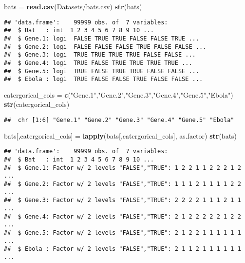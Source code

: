 \documentclass[
]{article}
\author{}
\date{\vspace{-2.5em}}
\newenvironment{Shaded}{\begin{snugshade}}{\end{snugshade}}
\newcommand{\FunctionTok}[1]{\textcolor[rgb]{0.13,0.29,0.53}{\textbf{#1}}}
\newcommand{\NormalTok}[1]{#1}
\newcommand{\OtherTok}[1]{\textcolor[rgb]{0.56,0.35,0.01}{#1}}
\newcommand{\StringTok}[1]{\textcolor[rgb]{0.31,0.60,0.02}{#1}}
\begin{document}
\begin{Shaded}
\begin{Highlighting}[]
\NormalTok{bats }\OtherTok{=} \FunctionTok{read.csv}\NormalTok{(}\StringTok{\textquotesingle{}Datasets/bats.csv\textquotesingle{}}\NormalTok{)}
\FunctionTok{str}\NormalTok{(bats)}
\end{Highlighting}
\end{Shaded}

\begin{verbatim}
## 'data.frame':    99999 obs. of  7 variables:
##  $ Bat   : int  1 2 3 4 5 6 7 8 9 10 ...
##  $ Gene.1: logi  FALSE TRUE TRUE FALSE FALSE TRUE ...
##  $ Gene.2: logi  FALSE FALSE FALSE TRUE FALSE FALSE ...
##  $ Gene.3: logi  TRUE TRUE TRUE TRUE FALSE FALSE ...
##  $ Gene.4: logi  TRUE FALSE TRUE TRUE TRUE TRUE ...
##  $ Gene.5: logi  TRUE FALSE TRUE TRUE FALSE FALSE ...
##  $ Ebola : logi  TRUE FALSE FALSE TRUE FALSE FALSE ...
\end{verbatim}

\begin{Shaded}
\begin{Highlighting}[]
\NormalTok{catergorical\_cols }\OtherTok{=} \FunctionTok{c}\NormalTok{(}\StringTok{"Gene.1"}\NormalTok{,}\StringTok{"Gene.2"}\NormalTok{,}\StringTok{"Gene.3"}\NormalTok{,}\StringTok{"Gene.4"}\NormalTok{,}\StringTok{"Gene.5"}\NormalTok{,}\StringTok{"Ebola"}\NormalTok{)}
\FunctionTok{str}\NormalTok{(catergorical\_cols)}
\end{Highlighting}
\end{Shaded}

\begin{verbatim}
##  chr [1:6] "Gene.1" "Gene.2" "Gene.3" "Gene.4" "Gene.5" "Ebola"
\end{verbatim}

\begin{Shaded}
\begin{Highlighting}[]
\NormalTok{bats[,catergorical\_cols] }\OtherTok{=} \FunctionTok{lapply}\NormalTok{(bats[,catergorical\_cols], as.factor)}
\FunctionTok{str}\NormalTok{(bats)}
\end{Highlighting}
\end{Shaded}

\begin{verbatim}
## 'data.frame':    99999 obs. of  7 variables:
##  $ Bat   : int  1 2 3 4 5 6 7 8 9 10 ...
##  $ Gene.1: Factor w/ 2 levels "FALSE","TRUE": 1 2 2 1 1 2 2 2 1 2 ...
##  $ Gene.2: Factor w/ 2 levels "FALSE","TRUE": 1 1 1 2 1 1 1 1 2 2 ...
##  $ Gene.3: Factor w/ 2 levels "FALSE","TRUE": 2 2 2 2 1 1 1 2 1 1 ...
##  $ Gene.4: Factor w/ 2 levels "FALSE","TRUE": 2 1 2 2 2 2 2 1 2 2 ...
##  $ Gene.5: Factor w/ 2 levels "FALSE","TRUE": 2 1 2 2 1 1 1 1 1 1 ...
##  $ Ebola : Factor w/ 2 levels "FALSE","TRUE": 2 1 1 2 1 1 1 1 1 1 ...
\end{verbatim}
\end{document}
